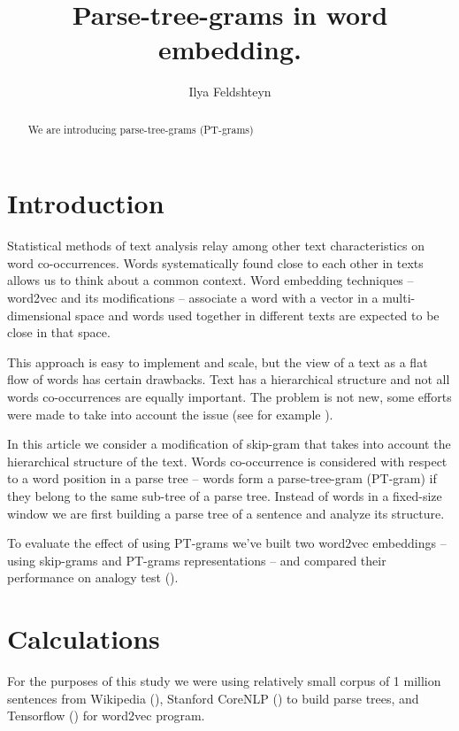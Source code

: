 \documentclass[12pt]{article}
\title{Parse-tree-grams in word embedding.}
\author{Ilya Feldshteyn}
\begin{document}
\maketitle

\begin{abstract}
We are introducing parse-tree-grams (PT-grams) 
\end{abstract}


\section{Introduction}

Statistical methods of text analysis relay among other
text characteristics on word co-occurrences.
Words systematically found close to each other in texts
allows us to think about a common context. Word
embedding techniques -- word2vec and its modifications --
associate a word with a vector in a multi-dimensional
space and words used together in different texts are
expected to be close in that space.

This approach is easy to implement and scale,
but the view of a text as a flat flow of words has
certain drawbacks. Text has a hierarchical structure
and not all words co-occurrences are equally important.
The problem is not new, some efforts were made to take
into account the issue 
(see for example \cite{DBLP:journals/corr/AvrahamG17}).

In this article we consider a modification of
skip-gram that takes into account the hierarchical structure of the
text. Words co-occurrence is considered with respect to a
word position in a parse tree -- words form a parse-tree-gram 
(PT-gram) if they belong to the same sub-tree of a parse tree.
Instead of words in a fixed-size window we are first building
a parse tree of a sentence and analyze its structure.

To evaluate the effect of using PT-grams we've built
two word2vec embeddings -- using skip-grams and PT-grams representations --
and compared their performance on analogy test 
(\cite{DBLP:journals/corr/abs-1301-3781}).

\section{Calculations}

For the purposes of this study we were using relatively small
corpus of 1 million sentences from Wikipedia (\cite{leipzigcorpora}),
Stanford CoreNLP (\cite{corenlp}) to build parse trees, and
Tensorflow (\cite{tensorflow}) for word2vec program.
\end{document}
